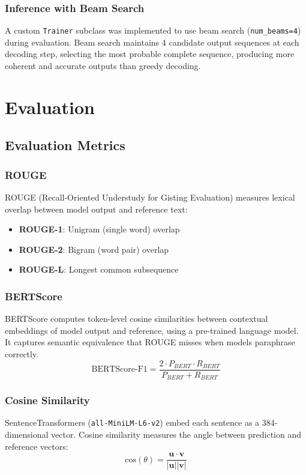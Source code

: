 \documentclass[12pt, a4paper]{report}
\begin{document}
\subsection{Inference with Beam Search}
A custom \texttt{Trainer} subclass was implemented to use beam search (\texttt{num\_beams=4}) during evaluation. Beam search maintains 4 candidate output sequences at each decoding step, selecting the most probable complete sequence, producing more coherent and accurate outputs than greedy decoding.

\chapter{Evaluation}

\section{Evaluation Metrics}

\subsection{ROUGE}
ROUGE (Recall-Oriented Understudy for Gisting Evaluation) measures lexical overlap between model output and reference text:
\begin{itemize}
    \item \textbf{ROUGE-1}: Unigram (single word) overlap
    \item \textbf{ROUGE-2}: Bigram (word pair) overlap
    \item \textbf{ROUGE-L}: Longest common subsequence
\end{itemize}

\subsection{BERTScore}
BERTScore computes token-level cosine similarities between contextual embeddings of model output and reference, using a pre-trained language model. It captures semantic equivalence that ROUGE misses when models paraphrase correctly.
$$\text{BERTScore-F1} = \frac{2 \cdot P_{BERT} \cdot R_{BERT}}{P_{BERT} + R_{BERT}}$$

\subsection{Cosine Similarity}
SentenceTransformers (\texttt{all-MiniLM-L6-v2}) embed each sentence as a 384-dimensional vector. Cosine similarity measures the angle between prediction and reference vectors:
$$\text{cos}(\theta) = \frac{\mathbf{u} \cdot \mathbf{v}}{|\mathbf{u}||\mathbf{v}|}$$
\end{document}
